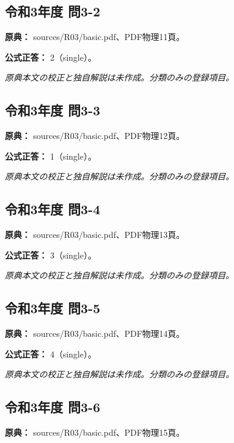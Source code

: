 \subsection{令和3年度 問3-2}
\label{q:r03-reg-basic-3-2}

\noindent\textbf{原典：} sources/R03/basic.pdf、PDF物理11頁。

\textbf{公式正答：} 2（single）。

\par\textit{原典本文の校正と独自解説は未作成。分類のみの登録項目。}

\subsection{令和3年度 問3-3}
\label{q:r03-reg-basic-3-3}

\noindent\textbf{原典：} sources/R03/basic.pdf、PDF物理12頁。

\textbf{公式正答：} 1（single）。

\par\textit{原典本文の校正と独自解説は未作成。分類のみの登録項目。}

\subsection{令和3年度 問3-4}
\label{q:r03-reg-basic-3-4}

\noindent\textbf{原典：} sources/R03/basic.pdf、PDF物理13頁。

\textbf{公式正答：} 3（single）。

\par\textit{原典本文の校正と独自解説は未作成。分類のみの登録項目。}

\subsection{令和3年度 問3-5}
\label{q:r03-reg-basic-3-5}

\noindent\textbf{原典：} sources/R03/basic.pdf、PDF物理14頁。

\textbf{公式正答：} 4（single）。

\par\textit{原典本文の校正と独自解説は未作成。分類のみの登録項目。}

\subsection{令和3年度 問3-6}
\label{q:r03-reg-basic-3-6}

\noindent\textbf{原典：} sources/R03/basic.pdf、PDF物理15頁。

